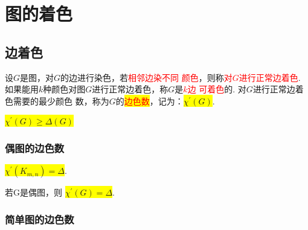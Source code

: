 \section{图的着色}
\subsection{边着色}

\begin{definition}
设$G$是图，对$G$的边进行染色，若\textcolor{red}{相邻边染不同
颜色}，则称\textcolor{red}{对$G$进行正常边着色}. 如果能用$k$种颜色对图$G$进行正常边着色，称$G$是\textcolor{red}{$k$边
可着色}的. 对$G$进行正常边着色需要的最少颜色
数，称为$G$的\colorbox{yellow}{\textcolor{red}{边色数}}，记为：\colorbox{yellow}{$\chi^{\prime}(G)$}.
\begin{note}
	\colorbox{yellow}{$\chi^{\prime}(G)\geq \varDelta(G)$}
\end{note}
\end{definition}

\subsubsection{偶图的边色数}
\begin{theorem}
	\colorbox{yellow}{$\chi^{\prime}(K_{m,n})= \varDelta$}.
\end{theorem}

\begin{theorem}[哥尼，1916]
	若G是偶图，则 
	\colorbox{yellow}{$\chi^{\prime}(G)= \varDelta$}.
\end{theorem}

\subsubsection{简单图的边色数}

